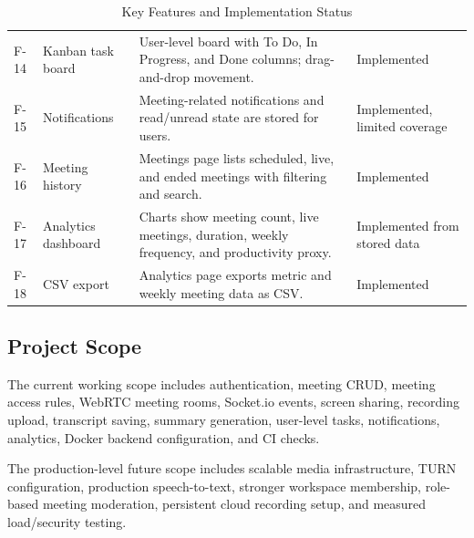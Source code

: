 \documentclass[11pt,a4paper]{article}
\begin{document}
\begin{table}[H]
\begin{tabularx}{\linewidth}{L{1.1cm} L{3.1cm} Y L{2.8cm}}
F-14 & Kanban task board & User-level board with To Do, In Progress, and Done columns; drag-and-drop movement. & Implemented\\
F-15 & Notifications & Meeting-related notifications and read/unread state are stored for users. & Implemented, limited coverage\\
F-16 & Meeting history & Meetings page lists scheduled, live, and ended meetings with filtering and search. & Implemented\\
F-17 & Analytics dashboard & Charts show meeting count, live meetings, duration, weekly frequency, and productivity proxy. & Implemented from stored data\\
F-18 & CSV export & Analytics page exports metric and weekly meeting data as CSV. & Implemented\\
\bottomrule
\end{tabularx}
\caption{Key Features and Implementation Status}
\label{tab:features}
\end{table}

\subsection{Project Scope}
The current working scope includes authentication, meeting CRUD, meeting access rules, WebRTC meeting rooms, Socket.io events, screen sharing, recording upload, transcript saving, summary generation, user-level tasks, notifications, analytics, Docker backend configuration, and CI checks.

The production-level future scope includes scalable media infrastructure, TURN configuration, production speech-to-text, stronger workspace membership, role-based meeting moderation, persistent cloud recording setup, and measured load/security testing.

\newpage

\end{document}
